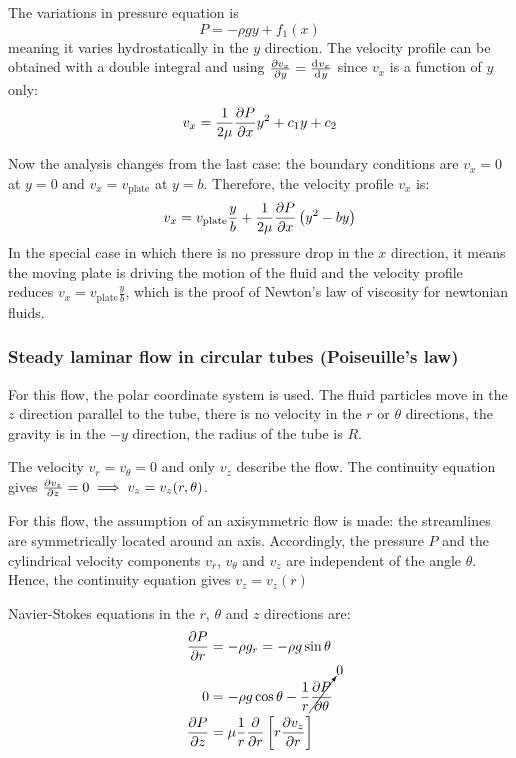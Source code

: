 \documentclass[10pt, twocolumn]{article}
\begin{document}
The variations in pressure equation is
\[
  P = -\rho g y + f_1(x)
\]
meaning it varies hydrostatically in the \(y\) direction.
The velocity profile can be obtained with a double integral and using \(\frac{\partial v_x}{\partial y} = \frac{\mathrm{d}^{} v_x}{\mathrm{d}^{} y}\) since \(v_x\) is a function of \(y\) only:
\[
  v_x = \frac{1}{2\mu} \frac{\partial P}{\partial x} y^2 + c_1 y + c_2
\]

Now the analysis changes from the last case: the boundary conditions are \(v_x = 0\) at \(y = 0\) and \(v_x = v_\mathrm{plate}\) at \(y = b\).
Therefore, the velocity profile \(v_x\) is:
\[
  v_x = v_\mathrm{plate} \frac{y}{b} + \frac{1}{2\mu} \frac{\partial P}{\partial x} \left( y^2 - by \right)
\]
In the special case in which there is no pressure drop in the \(x\) direction, it means the moving plate is driving the motion of the fluid and the velocity profile reduces \(v_x = v_\mathrm{plate} \frac{y}{b}\), which is the proof of Newton's law of viscosity for newtonian fluids.


\subsubsection{Steady laminar flow in circular tubes (Poiseuille's law)}
For this flow, the polar coordinate system is used.
The fluid particles move in the \(z\) direction parallel to the tube, there is no velocity in the \(r\) or \(\theta\) directions, the gravity is in the \(-y\) direction, the radius of the tube is \(R\).

The velocity \(v_r = v_\theta = 0\) and only \(v_z\) describe the flow.
The continuity equation gives \(\frac{\partial v_z}{\partial z} = 0 \implies v_z = v_z(r,\theta)\).

For this flow, the assumption of an axisymmetric flow is made: the streamlines are symmetrically located around an axis.
Accordingly, the pressure \(P\) and the cylindrical velocity components \(v_r\), \(v_\theta\) and \(v_z\) are independent of the angle \(\theta\).
Hence, the continuity equation gives \(v_z = v_z(r)\)

Navier-Stokes equations in the \(r\), \(\theta\) and \(z\) directions are:
\begin{align*}
  \frac{\partial P}{\partial r} & = -\rho g_r = -\rho g \sin\theta                                                      \\
  0                        & = - \rho g \cos\theta - \frac{1}{r} \cancelto{0}{\frac{\partial P}{\partial \theta}}       \\
  \frac{\partial P}{\partial z} & = \mu \frac{1}{r} \frac{\partial }{\partial r} \left[ r \frac{\partial v_z}{\partial r} \right]
\end{align*}
\end{document}
